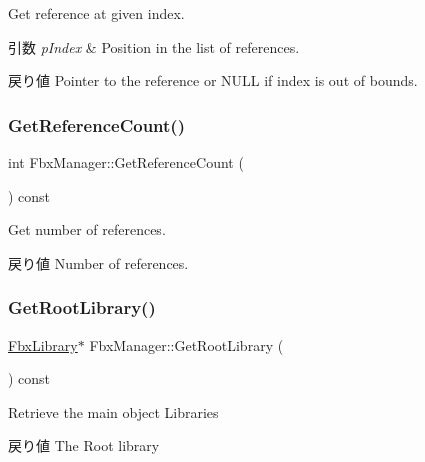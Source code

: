Get reference at given index. 
\begin{DoxyParams}{引数}
{\em p\+Index} & Position in the list of references. \\
\hline
\end{DoxyParams}
\begin{DoxyReturn}{戻り値}
Pointer to the reference or {\ttfamily N\+U\+LL} if index is out of bounds. 
\end{DoxyReturn}
\mbox{\label{class_fbx_manager_a361483c46708f864cfdf800ef1e3976e}} 
\subsubsection{\texorpdfstring{Get\+Reference\+Count()}{GetReferenceCount()}}
{\footnotesize\ttfamily int Fbx\+Manager\+::\+Get\+Reference\+Count (\begin{DoxyParamCaption}{ }\end{DoxyParamCaption}) const}

Get number of references. \begin{DoxyReturn}{戻り値}
Number of references. 
\end{DoxyReturn}
\mbox{\label{class_fbx_manager_abc14fc10d71fedc5932bc44cc1b63312}} 
\subsubsection{\texorpdfstring{Get\+Root\+Library()}{GetRootLibrary()}}
{\footnotesize\ttfamily \hyperlink{class_fbx_library}{Fbx\+Library}$\ast$ Fbx\+Manager\+::\+Get\+Root\+Library (\begin{DoxyParamCaption}{ }\end{DoxyParamCaption}) const}

Retrieve the main object Libraries \begin{DoxyReturn}{戻り値}
The Root library 
\end{DoxyReturn}
\mbox{\label{class_fbx_manager_a4b1aa7141334ae101be5405f406c644f}} 
